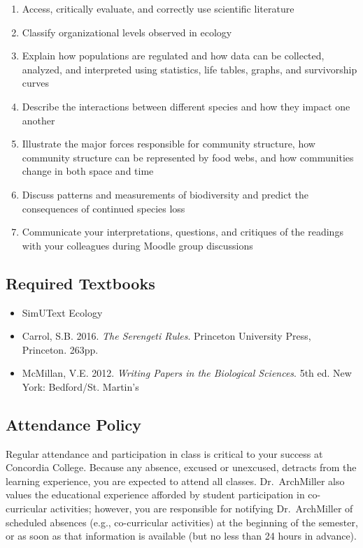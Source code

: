 \documentclass{tufte-handout}
\begin{document}
\begin{fullwidth}
\begin{enumerate}
	\item Access, critically evaluate, and correctly use scientific literature
	\item Classify organizational levels observed in ecology
	\item Explain how populations are regulated and how data can be collected, analyzed, and interpreted using statistics, life tables, graphs, and survivorship curves
	\item Describe the interactions between different species and how they impact one another
	\item Illustrate the major forces responsible for community structure, how community structure can be represented by food webs, and how communities change in both space and time
	\item Discuss patterns and measurements of biodiversity and predict the consequences of continued species loss
	\item Communicate your interpretations, questions, and critiques of the readings with your colleagues during Moodle group discussions
\end{enumerate}

\subsection{Required Textbooks}

\begin{itemize}
	\item SimUText Ecology
	\item Carrol, S.B. 2016. \emph{The Serengeti Rules}. Princeton University Press, Princeton. 263pp.
	\item McMillan, V.E. 2012. \emph{Writing Papers in the Biological Sciences}. 5th ed. New York: Bedford/St. Martin's
\end{itemize}

\subsection{Attendance Policy}

Regular attendance and participation in class is critical to your success at Concordia College. Because any absence, excused or unexcused, detracts from the learning experience, you are expected to attend all classes. Dr.~ArchMiller also values the educational experience afforded by student participation in co-curricular activities; however, you are responsible for notifying Dr.~ArchMiller of scheduled absences (e.g., co-curricular activities) at the beginning of the semester, or as soon as that information is available (but no less than 24 hours in advance). 


\end{fullwidth}
\end{document}
